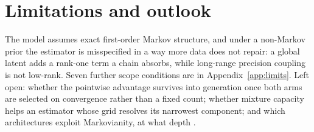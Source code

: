 \documentclass{article}
\theoremstyle{definition}
\theoremstyle{plain}
\begin{document}
\noindent

\section{Limitations and outlook}
\label{sec:limits}

The model assumes exact first-order Markov structure, and under a non-Markov prior the estimator is
misspecified in a way more data does not repair: a global latent adds a rank-one term a chain
absorbs, while long-range precision coupling is not low-rank. Seven further scope conditions are in
Appendix~\ref{app:limits}. Left open: whether the pointwise advantage survives into generation
once both arms are selected on convergence rather than a fixed count; whether mixture capacity
helps an estimator whose grid resolves its narrowest component; and which architectures exploit
Markovianity, at what depth \citep{mei2024unets,garnierbrun2024transformers}.


\label{LastMainPage}



\clearpage
\appendix

\end{document}
